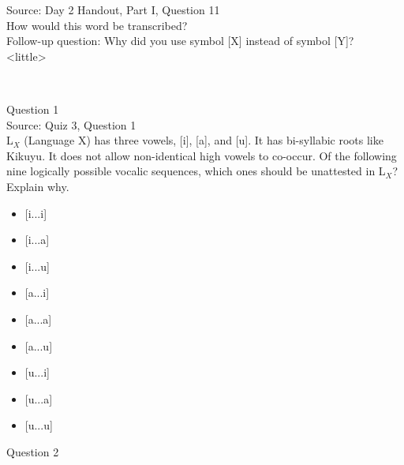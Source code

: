 \documentclass[12pt]{article}
\begin{document}
Source: Day 2 Handout, Part I, Question 11\\

How would this word be transcribed?\\ Follow-up question: Why did you use symbol [X] instead of symbol [Y]?\\

<little>


\newpage

\begin{center}
\textbf{{\color{red}{\HUGE END OF EXAM}}}\\

\end{center}
\newpage

\begin{center}
\textbf{{\color{blue}{\HUGE START OF EXAM\\}}}

\textbf{{\color{blue}{\HUGE Student ID: 4465\\}}}

\textbf{{\color{blue}{\HUGE 2:30 - 2:45 PM\\}}}

\end{center}
\newpage

{\large Question 1}\\

Source: Quiz 3, Question 1\\

L$_X$ (Language X) has three vowels, [i], [a], and [u]. It has bi-syllabic roots like Kikuyu. It does not allow non-identical high vowels to co-occur. Of the following nine logically possible vocalic sequences, which ones should be unattested in L$_X$? Explain why.\\

\begin{itemize} \item {[i...i]} \item {[i...a]} \item {[i...u]} \item {[a...i]} \item {[a...a]} \item {[a...u]} \item {[u...i]} \item {[u...a]} \item {[u...u]} \end{itemize}


\newpage

{\large Question 2}\\
\end{document}

